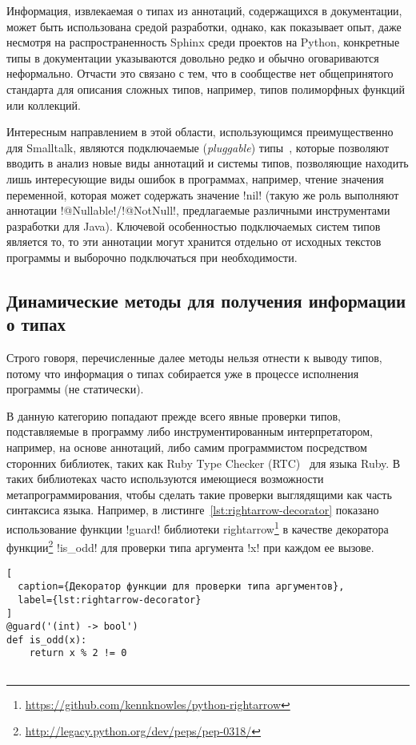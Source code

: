 Информация, извлекаемая о типах из аннотаций, содержащихся в
документации, может быть использована средой разработки, однако, как показывает
опыт, даже несмотря на распространенность Sphinx среди проектов на Python,
конкретные типы в документации указываются довольно редко и обычно оговариваются
неформально.  Отчасти это связано с тем, что в сообществе нет общепринятого
стандарта для описания сложных типов, например, типов полиморфных функций или
коллекций.

Интересным направлением в этой области, использующимся преимущественно для
Smalltalk, являются подключаемые (\emph{pluggable}) типы~\cite{Haldiman2009},
которые позволяют вводить в анализ новые виды аннотаций и системы типов,
позволяющие находить лишь интересующие виды ошибок в программах, например,
чтение значения переменной, которая может содержать значение !nil! (такую же
роль выполняют аннотации !@Nullable!/!@NotNull!, предлагаемые различными инструментами
разработки для Java). Ключевой особенностью подключаемых систем типов является
то, то эти аннотации могут хранится отдельно от исходных текстов программы и
выборочно подключаться при необходимости.


\subsection{Динамические методы для получения информации о типах}
\label{sub:dynamic-checks}

Строго говоря, перечисленные далее методы нельзя отнести к выводу типов, потому
что информация о типах собирается уже в процессе исполнения программы (не
статически).

В данную категорию попадают прежде всего явные проверки типов, подставляемые в
программу либо инструментированным интерпретатором, например, на основе
аннотаций, либо самим программистом посредством сторонних библиотек, таких как
Ruby Type Checker (RTC)~\cite{Ren2013} для языка Ruby. В таких библиотеках часто
используются имеющиеся возможности метапрограммирования, чтобы сделать такие
проверки выглядящими как часть синтаксиса языка. Например, в
листинге~\ref{lst:rightarrow-decorator} показано использование функции !guard!
библиотеки
rightarrow\footnote{\url{https://github.com/kennknowles/python-rightarrow}} в
качестве декоратора
функции\footnote{\url{http://legacy.python.org/dev/peps/pep-0318/}} !is_odd! для
проверки типа аргумента !x! при каждом ее вызове.
\begin{lstlisting}[
  caption={Декоратор функции для проверки типа аргументов},
  label={lst:rightarrow-decorator}
]
@guard('(int) -> bool')
def is_odd(x):
    return x % 2 != 0
    
\end{lstlisting}


